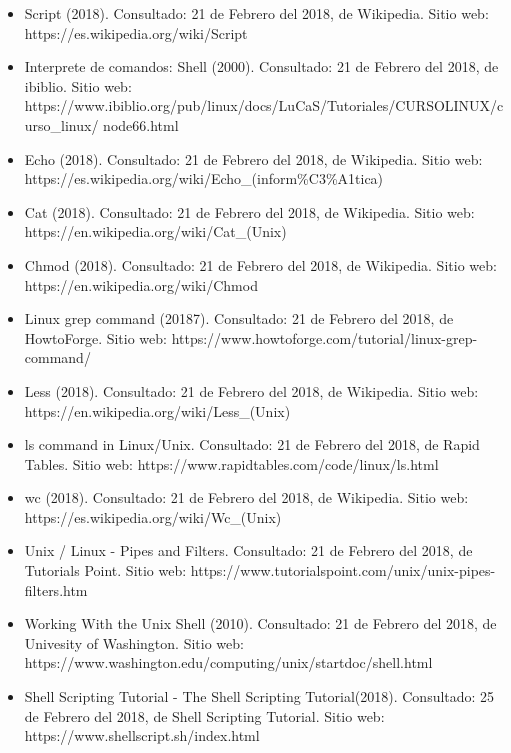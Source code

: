 \documentclass[a4paper]{article}
\begin{document}
\begin{itemize}
\item Script (2018). Consultado: 21 de Febrero del 2018, de Wikipedia. Sitio web:\\
https://es.wikipedia.org/wiki/Script
\item Interprete de comandos: Shell (2000). Consultado: 21 de Febrero del 2018, de ibiblio. Sitio web: https://www.ibiblio.org/pub/linux/docs/LuCaS/Tutoriales/CURSOLINUX/curso\_linux/ node66.html
\item Echo (2018). Consultado: 21 de Febrero del 2018, de Wikipedia. Sitio web: \\ https://es.wikipedia.org/wiki/Echo\_(inform\%C3\%A1tica)
\item Cat (2018). Consultado: 21 de Febrero del 2018, de Wikipedia. Sitio web: \\ https://en.wikipedia.org/wiki/Cat\_(Unix)
\item Chmod (2018). Consultado: 21 de Febrero del 2018, de Wikipedia. Sitio web: \\ https://en.wikipedia.org/wiki/Chmod
\item Linux grep command (20187). Consultado: 21 de Febrero del 2018, de HowtoForge. Sitio web: https://www.howtoforge.com/tutorial/linux-grep-command/
\item Less (2018). Consultado: 21 de Febrero del 2018, de Wikipedia. Sitio web: \\  https://en.wikipedia.org/wiki/Less\_(Unix)
\item ls command in Linux/Unix. Consultado: 21 de Febrero del 2018, de Rapid Tables. Sitio web: https://www.rapidtables.com/code/linux/ls.html
\item wc (2018). Consultado: 21 de Febrero del 2018, de Wikipedia. Sitio web: \\  https://es.wikipedia.org/wiki/Wc\_(Unix)
\item Unix / Linux - Pipes and Filters. Consultado: 21 de Febrero del 2018, de Tutorials Point. Sitio web: https://www.tutorialspoint.com/unix/unix-pipes-filters.htm
\item Working With the Unix Shell (2010). Consultado: 21 de Febrero del 2018, de Univesity of Washington. Sitio web: https://www.washington.edu/computing/unix/startdoc/shell.html
\item Shell Scripting Tutorial - The Shell Scripting Tutorial(2018). Consultado: 25 de Febrero del 2018, de Shell Scripting Tutorial. Sitio web: https://www.shellscript.sh/index.html
\end{itemize}
\end{document}

